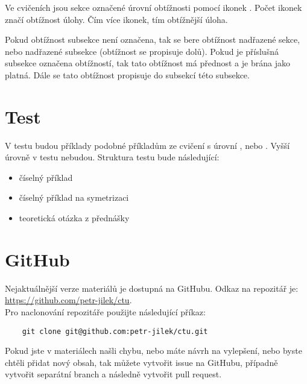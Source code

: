 \documentclass{article}
\begin{document}
Ve cvičeních jsou sekce označené úrovní obtížnosti pomocí ikonek \spicy. Počet ikonek značí obtížnost úlohy. Čím více ikonek, tím obtížnější úloha.

Pokud obtížnost subsekce není označena, tak se bere obtížnost nadřazené sekce, nebo nadřazené subsekce (obtížnost se propisuje dolů). Pokud je příslušná subsekce označena obtížností, tak tato obtížnost má přednost a je brána jako platná. Dále se tato obtížnost propisuje do subsekcí této subsekce.



\section{Test}

V testu budou příklady podobné příkladům ze cvičení s úrovní \spicy, nebo \spicy \spicy. Vyšší úrovně v testu nebudou. Struktura testu bude následující:

\begin{itemize}
    \item číselný příklad
    \item číselný příklad na symetrizaci
    \item teoretická otázka z přednášky
\end{itemize}



\section{GitHub}
Nejaktuálnější verze materiálů je dostupná na GitHubu. Odkaz na repozitář je: \href{https://github.com/petr-jilek/ctu}{https://github.com/petr-jilek/ctu}.\\

Pro naclonování repozitáře použijte následující příkaz:

\begin{verbatim}
    git clone git@github.com:petr-jilek/ctu.git
\end{verbatim}

Pokud jste v materiálech našli chybu, nebo máte návrh na vylepšení, nebo byste chtěli přidat nový obsah, tak můžete vytvořit issue na GitHubu, případně vytvořit separátní branch a následně vytvořit pull request.
\end{document}
